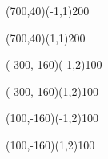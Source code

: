 \documentclass[12pt]{article}
\begin{document}
\begin{figure}[htb]
\begin{egame}
\putbranch(700,40)(-1,1){200}

\renewcommand{\egarrowstyle}{e}

\putbranch(700,40)(1,1){200}

\renewcommand{\egarrowstyle}{}

\putbranch(-300,-160)(-1,2){100}

\renewcommand{\egarrowstyle}{}

\putbranch(-300,-160)(1,2){100}

\renewcommand{\egarrowstyle}{e}

\putbranch(100,-160)(-1,2){100}

\renewcommand{\egarrowstyle}{e}

\putbranch(100,-160)(1,2){100}

\renewcommand{\egarrowstyle}{}


\end{egame}
\end{figure}
\end{document}
